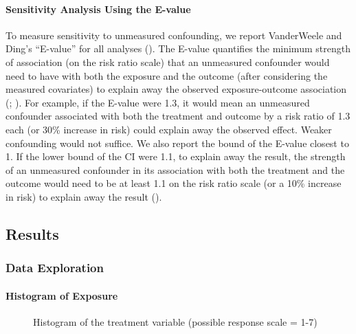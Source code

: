 \documentclass[
  singlecolumn]{article}
\let\oldparagraph\paragraph
\renewcommand{\paragraph}[1]{\oldparagraph{#1}\mbox{}}
\begin{document}
\paragraph{Sensitivity Analysis Using the
E-value}\label{sensitivity-analysis-using-the-e-value}

To measure sensitivity to unmeasured confounding, we report VanderWeele
and Ding's ``E-value'' for all analyses
(). The E-value
quantifies the minimum strength of association (on the risk ratio scale)
that an unmeasured confounder would need to have with both the exposure
and the outcome (after considering the measured covariates) to explain
away the observed exposure-outcome association
(;
). For
example, if the E-value were 1.3, it would mean an unmeasured confounder
associated with both the treatment and outcome by a risk ratio of 1.3
each (or 30\% increase in risk) could explain away the observed effect.
Weaker confounding would not suffice. We also report the bound of the
E-value closest to 1. If the lower bound of the CI were 1.1, to explain
away the result, the strength of an unmeasured confounder in its
association with both the treatment and the outcome would need to be at
least 1.1 on the risk ratio scale (or a 10\% increase in risk) to
explain away the result ().

\subsection{Results}\label{results}

\subsubsection{Data Exploration}\label{data-exploration}

\paragraph{Histogram of Exposure}\label{histogram-of-exposure}

\begin{figure}


\caption{\label{fig-histogram}Histogram of the treatment variable
(possible response scale = 1-7)}

\end{figure}%
\end{document}
